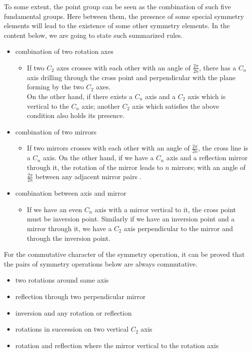 To some extent, the point group can be seen as the combination of such
five fundamental groups. Here between them, the presence of some
special symmetry elements will lead to the existence of some other
symmetry elements. In the content below, we are going to state such
summarized rules.
\begin{itemize}
\item combination of two rotation axes
  \begin{itemize}
  \item If two $C_{2}$ axes crosses with each other with an angle of
    $\frac{2\pi}{2n}$, there has a $C_{n}$ axis drilling through the
    cross point and perpendicular with the plane forming by the two
    $C_{2}$ axes. \\
    On the other hand, if there exists a $C_{n}$ axis and a $C_{2}$
    axis which is vertical to the $C_{n}$ axis; another $C_{2}$ axis
    which satisfies the above condition also holds its presence.
  \end{itemize}
\item combination of two mirrors
  \begin{itemize}
  \item If two mirrors crosses with each other with an angle of
    $\frac{2\pi}{2n}$, the cross line is a $C_{n}$ axis. On the other
    hand, if we have a $C_{n}$ axis and a reflection mirror through
    it, the rotation of the mirror leads to $n$ mirrors; with an angle
    of $\frac{2\pi}{2n}$ between any adjacent mirror pairs .
  \end{itemize}
\item combination between axis and mirror
  \begin{itemize}
  \item If we have an even $C_{n}$ axis with a mirror vertical to it,
    the cross point must be inversion point. Similarly if we have an
    inversion point and a mirror through it, we have a $C_{2}$ axis
    perpendicular to the mirror and through the inversion point.
  \end{itemize}
\end{itemize}

For the commutative character of the symmetry operation, it can be
proved that the pairs of symmetry operations below are always
commutative.
\begin{itemize}
\item two rotations around same axis
\item reflection through two perpendicular mirror
\item inversion and any rotation or reflection
\item rotations in succession on two vertical $C_{2}$ axis
\item rotation and reflection where the mirror vertical to the
  rotation axis
\end{itemize}


